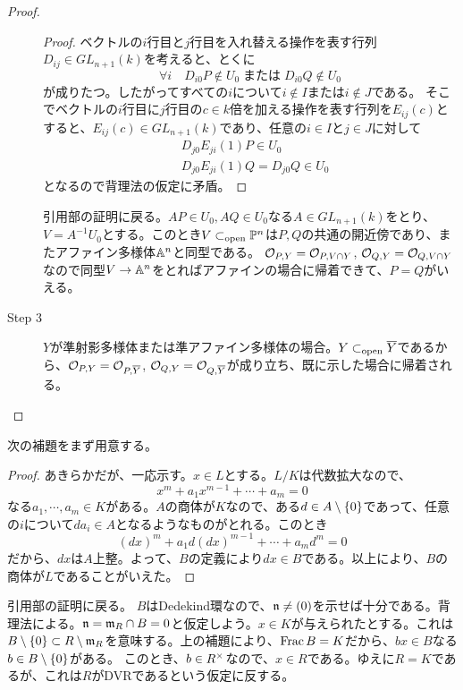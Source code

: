 \begin{proof}
\begin{description}
\begin{proof}
ベクトルの$i$行目と$j$行目を入れ替える操作を表す行列$D_{ij} \in GL_{n+1}(k)$を考えると、とくに
\[
\forall i \quad D_{i0}P \notin U_0  \; \text{または} \;  D_{i0}Q \notin U_0
\]
が成りたつ。したがってすべての$i$について$i \notin I$または$i \notin J$である。
そこでベクトルの$i$行目に$j$行目の$c \in k$倍を加える操作を表す行列を$E_{ij}(c)$とすると、$E_{ij}(c) \in GL_{n+1}(k)$であり、任意の$i \in I$と$j \in J$に対して
\begin{align*}
  &D_{j0} E_{ji}(1) P \in U_0 \\
  &D_{j0} E_{ji}(1) Q = D_{j0}Q \in U_0
\end{align*}
となるので背理法の仮定に矛盾。
    \end{proof}
    引用部の証明に戻る。$AP \in U_0 ,  AQ \in U_0$なる$A \in GL_{n+1}(k)$をとり、$V = A^{-1}U_0$とする。このとき$V \subset_{\text{open}} {\mathbb P}^n$は$P,Q$の共通の開近傍であり、またアファイン多様体${\mathbb A}^n$と同型である。
    $\mathcal{O}_{P,Y} = \mathcal{O}_{P,V \cap Y}$, $\mathcal{O}_{Q,Y} = \mathcal{O}_{Q,V \cap Y}$なので同型$V \to {\mathbb A}^n$をとればアファインの場合に帰着できて、$P = Q$がいえる。
    \item[Step 3] $Y$が準射影多様体または準アファイン多様体の場合。$Y \subset_{\text{open}} \overline{Y}$であるから、$\mathcal{O}_{P,Y} = \mathcal{O}_{P,\overline{Y}}$, $\mathcal{O}_{Q,Y} = \mathcal{O}_{Q,\overline{Y}}$が成り立ち、既に示した場合に帰着される。
  \end{description}
\end{proof}


\begin{rem}
  次の補題をまず用意する。
  \begin{proof}
    あきらかだが、一応示す。$x \in L$とする。$L/K$は代数拡大なので、
    \[
    x^m + a_1 x^{m-1} + \cdots + a_m = 0
    \]
    なる$a_1 , \cdots , a_m \in K$がある。$A$の商体が$K$なので、ある$d \in A \setminus \{0\}$であって、任意の$i$について$da_i \in A$となるようなものがとれる。このとき
    \[
    (dx)^m + a_1d (dx)^{m-1} + \cdots + a_md^m = 0
    \]
    だから、$dx$は$A$上整。よって、$B$の定義により$dx \in B$である。以上により、$B$の商体が$L$であることがいえた。
  \end{proof}
  引用部の証明に戻る。
$B$はDedekind環なので、$\mathfrak{n} \neq (0)$を示せば十分である。背理法による。$\mathfrak{n} = \mathfrak{m}_R \cap B = 0$と仮定しよう。$x \in K$が与えられたとする。これは$B \setminus \{0\} \subset R \setminus \mathfrak{m}_R$を意味する。上の補題により、$\operatorname{Frac} B = K$だから、$bx \in B$なる$b \in B \setminus \{0\}$がある。
このとき、$b \in R^{\times}$なので、$x \in R$である。ゆえに$R = K$であるが、これは$R$がDVRであるという仮定に反する。
\end{rem}

